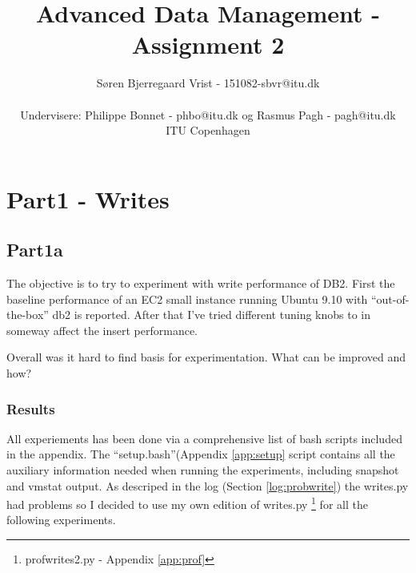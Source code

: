 
\title{Advanced Data Management - Assignment 2}
\author{S\o ren Bjerregaard Vrist - 151082-sbvr@itu.dk\\ \\Undervisere: Philippe
Bonnet - phbo@itu.dk og
Rasmus Pagh - pagh@itu.dk\\ITU Copenhagen}



\maketitle

\chapter{Part1 - Writes}
\section{Part1a}
The objective is to try to experiment with write performance of DB2. 
First the baseline performance of an EC2 small instance running Ubuntu 9.10 with
``out-of-the-box'' db2 is reported. After that I've tried different tuning knobs
to in someway affect the insert performance.

Overall was it hard to find basis for experimentation. What can be improved and
how? 

\subsection{Results}
All experiements has been done via a comprehensive list of bash scripts included
in the appendix. The ``setup.bash''(Appendix \ref{app:setup} script contains all the auxiliary
information needed when running the experiments, including snapshot and vmstat
output. As descriped in the log (Section \ref{log:probwrite}) the writes.py had
problems so I decided to use my own edition of writes.py \footnote{profwrites2.py -
Appendix \ref{app:prof}} for all the following experiments.


